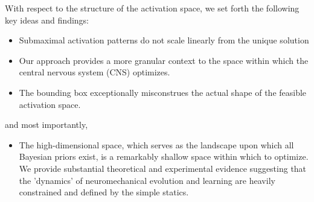 With respect to the structure of the activation space, we set forth the following key ideas and findings:
\begin{itemize}
\item {Submaximal activation patterns do not scale linearly from the unique solution}
\item {Our approach provides a more granular context to the space within which the central nervous system (CNS) optimizes.}
\item {The bounding box exceptionally misconstrues the actual shape of the feasible activation space.}
\end{itemize}
and most importantly,
\begin{itemize}
\item {The high-dimensional space, which serves as the landscape upon which all Bayesian priors exist, is a remarkably shallow space within which to optimize. We provide substantial theoretical and experimental evidence suggesting that the 'dynamics' of neuromechanical evolution and learning are heavily constrained and defined by the simple statics.}
\end{itemize}

